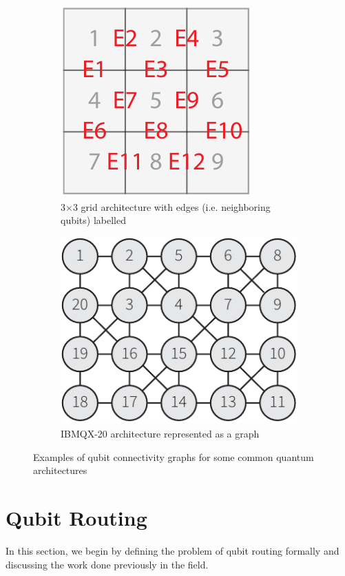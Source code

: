 \begin{figure}
    \centering
    \begin{subfigure}[b]{0.4\linewidth}
        \centering
        \includegraphics[width=0.5\linewidth]{figures/qroute/Grid-device.pdf}
        \caption{3$\times$3 grid architecture with edges (i.e. neighboring qubits) labelled \label{fig:3-3-arch}}
    \end{subfigure}
    \begin{subfigure}[b]{0.5\linewidth}
        \centering
        \includegraphics[width=0.5\linewidth]{figures/qroute/QX20-device.pdf}
        \caption{IBMQX-20 architecture represented as a graph}
    \end{subfigure}
    \caption{Examples of qubit connectivity graphs for some common quantum architectures}
    \label{fig:topology-example}
\end{figure}

\section{\label{sec:qubit-routing}Qubit Routing}
In this section, we begin by defining the problem of qubit routing formally and discussing the work done previously in the field.

